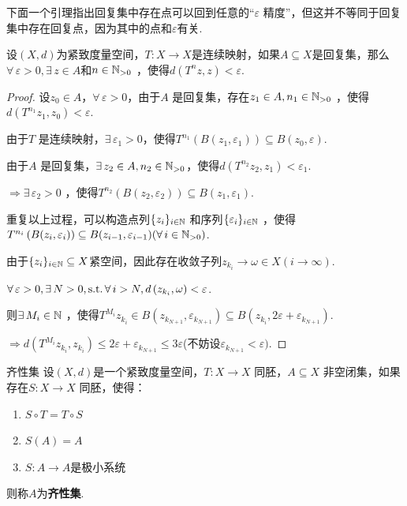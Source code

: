 下面一个引理指出回复集中存在点可以回到任意的“$\varepsilon$ 精度”，但这并不等同于回复集中存在回复点，因为其中的点和$\varepsilon$有关.\par 
\begin{lemma}
    设$(X,d)$为紧致度量空间，$T:X\to X$是连续映射，如果$A\subseteq X$是回复集，那么$\forall\, \varepsilon>0,\exists\, z\in A$和$n\in\mathbb{N}_{>0}$ ，使得$d \left(T^{n}z,z\right)<\varepsilon$.
\end{lemma}
\begin{proof}
    设$z_0\in A$，$\forall\, \varepsilon>0$，由于$A$ 是回复集，存在$z_1\in A,n_1\in\mathbb{N}_{>0}$ ，使得$d \left(T^{n_1}z_1,z_0\right)<\varepsilon$.\par
    由于$T$ 是连续映射，$\exists\, \varepsilon_1>0$，使得$T^{n_1}\left(B(z_1,\varepsilon_1)\right)\subseteq B(z_0,\varepsilon)$.\par
    由于$A$ 是回复集，$\exists\, z_2\in A,n_2\in\mathbb{N}_{>0}$，使得$d \left(T^{n_2}z_2,z_1\right)<\varepsilon_1$.\par
    $\Rightarrow \exists\, \varepsilon_2>0$ ，使得$T^{n_2}\left(B(z_2,\varepsilon_2)\right)\subseteq B(z_1,\varepsilon_1)$.\par
    重复以上过程，可以构造点列$\{z_i\}_{i\in\mathbb{N}}$ 和序列$\{\varepsilon_i\}_{i\in\mathbb{N}}$ ，使得$T^{n_i}\left(B(z_i,\varepsilon_i)\right)\subseteq B(z_{i-1},\varepsilon_{i-1})(\forall\, i\in\mathbb{N}_{>0})$.\par
    由于$\{z_i\}_{i\in\mathbb{N}}\subseteq X$紧空间，因此存在收敛子列$z_{k_i}\to\omega\in X(i\to\infty)$.\par
    $\forall\,\varepsilon>0,\exists\, N>0,\operatorname{\text{s.t.}}\forall\, i>N,d \left(z_{k_i},\omega\right)<\varepsilon$.\par
    则$\exists\, M_i\in\mathbb{N}$ ，使得$T^{M_i}{z_{k_i}}\in B \left(z_{k_{N+1}},\varepsilon_{k_{N+1}}\right)\subseteq B \left(z_{k_i},2\varepsilon+\varepsilon_{k_{N+1}}\right)$.\par
    $\Rightarrow d \left(T^{M_i}z_{k_i},z_{k_i}\right)\leq 2\varepsilon+\varepsilon_{k_{N+1}}\leq 3\varepsilon$(不妨设$\varepsilon_{k_{N+1}}<\varepsilon)$.\par
\end{proof}

\begin{definition}{齐性集}
    设$(X,d)$是一个紧致度量空间，$T:X\to X$ 同胚，$A\subseteq X$ 非空闭集，如果存在$S:X\to X$ 同胚，使得：
    \begin{enumerate}[(1)]
        \item $S\circ T=T\circ S$
        \item $S(A)=A$
        \item $S:A\to A$是极小系统
    \end{enumerate}
    则称$A$为\textbf{齐性集}.
\end{definition}

